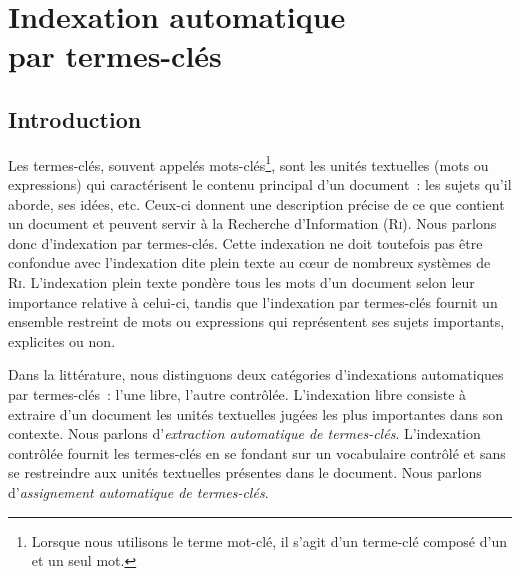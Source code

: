 \chapter[Indexation automatique par termes-clés]{Indexation automatique\\par termes-clés}
\label{part:main-state_of_the_art}

  \section{Introduction}
  \label{sec:main-state_of_the_art-introduction}
    Les termes-clés,
    souvent appelés mots-clés\footnote{Lorsque nous utilisons le terme
    \og{}mot-clé\fg{}, il s'agit d'un terme-clé composé d'un et un seul mot.},
    sont les unités textuelles (mots ou expressions) qui caractérisent le
    contenu principal d'un document~: les sujets qu'il aborde, ses idées, etc.
    Ceux-ci donnent une description précise de ce que contient un document et
    peuvent servir à la Recherche d'Information (\textsc{Ri}). Nous parlons donc
    d'indexation par termes-clés. Cette
    indexation ne doit toutefois pas être confondue avec l'indexation dite
    \og{}plein texte\fg{} au c\oe{}ur de nombreux systèmes de \textsc{Ri}.
    L'indexation plein texte pondère tous les mots d'un document selon leur
    importance relative à celui-ci, tandis que l'indexation par termes-clés
    fournit un ensemble restreint de mots ou expressions qui représentent ses
    sujets importants, explicites ou non.

    Dans la littérature, nous distinguons deux catégories d'indexations
    automatiques par termes-clés~: l'une libre, l'autre contrôlée. L'indexation
    libre consiste à extraire d'un document les unités textuelles
    jugées les plus importantes dans son contexte. Nous parlons
    d'\emph{extraction automatique de termes-clés}. L'indexation contrôlée fournit les termes-clés en se fondant sur un vocabulaire
    contrôlé et sans se restreindre aux unités textuelles présentes dans le
    document. Nous parlons d'\emph{assignement automatique de
    termes-clés}.

